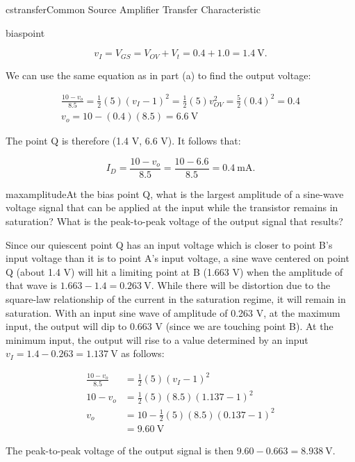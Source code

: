 \begin{mainquestion}{cstransfer}{Common Source Amplifier Transfer Characteristic}
\begin{partquestion}{biaspoint}
\begin{answer}
\[
v_{I} = V_{GS} = V_{OV} + V_{t} = 0.4 + 1.0 = 1.4\ \text{V}.
\]

We can use the same equation as in part (a) to find the output voltage:

\begin{gather*}
    \frac{10 - v_o}{8.5} = \frac{1}{2}(5)(v_I - 1)^2 = \frac{1}{2}(5)v_{OV}^2 = \frac{5}{2}(0.4)^2 = 0.4 \\
    v_o = 10 - (0.4)(8.5) = \qty{6.6}{\volt}
\end{gather*}

The point Q is therefore (1.4 V, 6.6 V). It follows that:

\[
I_{D} = \frac{10 - v_{o}}{8.5} = \frac{10 - 6.6}{8.5} = 0.4\ \text{mA}.
\]
\end{answer}
\end{partquestion}

\begin{partquestion}{maxamplitude}{At the bias point Q, what is the largest amplitude of a sine-wave voltage signal that can be applied at the input while the transistor remains in saturation? What is the peak-to-peak voltage of the output signal that results?}
\begin{answer}
Since our quiescent point Q has an input voltage which is closer to point B's input voltage than it is to point A's input voltage, a sine wave centered on point Q (about 1.4 V) will hit a limiting point at B (1.663 V) when the amplitude of that wave is $1.663 - 1.4 = 0.263\ \text{V}$. While there will be distortion due to the square-law relationship of the current in the saturation regime, it will remain in saturation. With an input sine wave of amplitude of 0.263 V, at the maximum input, the output will dip to 0.663 V (since we are touching point B). At the minimum input, the output will rise to a value determined by an input $v_{I} = 1.4 - 0.263 = 1.137\ \text{V}$ as follows:

\begin{align*}
    \frac{10 - v_o}{8.5} &= \frac{1}{2}(5)(v_I - 1)^2 \\
    10 - v_o &= \frac{1}{2}(5)(8.5)(1.137 - 1)^2 \\
    v_o &= 10 - \frac{1}{2}(5)(8.5)(0.137 - 1)^2 \\
    &= \qty{9.60}{\volt}
\end{align*}

The peak-to-peak voltage of the output signal is then $9.60 - 0.663 = 8.938\ \text{V}$.
\end{answer}
\end{partquestion}


\end{mainquestion}
